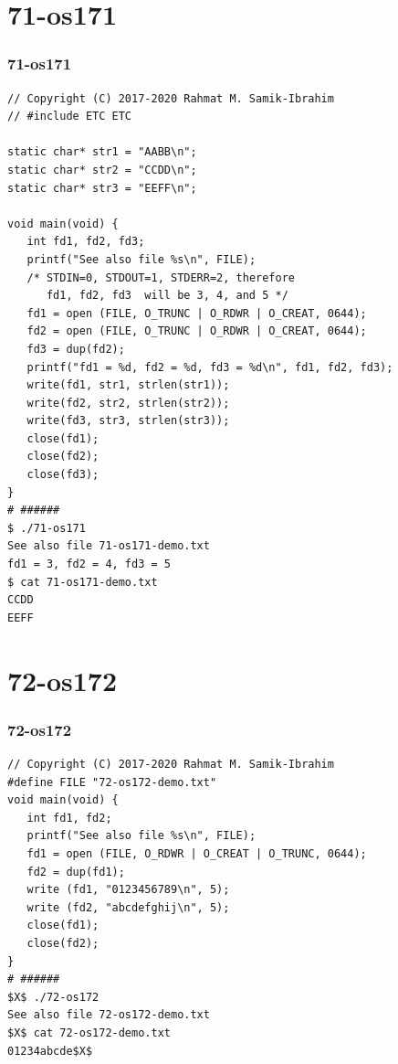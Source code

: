 \documentclass[aspectratio=169, xcolor=table, notheorems, hyperref={pdfpagelabels=false}]{beamer}
\begin{document}
\section{71-os171}
\begin{frame}[fragile]
\frametitle{71-os171}
\begin{lstlisting}[basicstyle=\ttfamily\tiny]
// Copyright (C) 2017-2020 Rahmat M. Samik-Ibrahim
// #include ETC ETC

static char* str1 = "AABB\n";
static char* str2 = "CCDD\n";
static char* str3 = "EEFF\n";

void main(void) {
   int fd1, fd2, fd3;
   printf("See also file %s\n", FILE);
   /* STDIN=0, STDOUT=1, STDERR=2, therefore 
      fd1, fd2, fd3  will be 3, 4, and 5 */
   fd1 = open (FILE, O_TRUNC | O_RDWR | O_CREAT, 0644);
   fd2 = open (FILE, O_TRUNC | O_RDWR | O_CREAT, 0644);
   fd3 = dup(fd2);
   printf("fd1 = %d, fd2 = %d, fd3 = %d\n", fd1, fd2, fd3);
   write(fd1, str1, strlen(str1));
   write(fd2, str2, strlen(str2));
   write(fd3, str3, strlen(str3));
   close(fd1);
   close(fd2);
   close(fd3);
}
# ######
$ ./71-os171 
See also file 71-os171-demo.txt
fd1 = 3, fd2 = 4, fd3 = 5
$ cat 71-os171-demo.txt 
CCDD
EEFF

\end{lstlisting}
\end{frame}

\section{72-os172}
\begin{frame}[fragile]
\frametitle{72-os172}
\begin{lstlisting}[basicstyle=\ttfamily\footnotesize]
// Copyright (C) 2017-2020 Rahmat M. Samik-Ibrahim
#define FILE "72-os172-demo.txt"
void main(void) {
   int fd1, fd2;
   printf("See also file %s\n", FILE);
   fd1 = open (FILE, O_RDWR | O_CREAT | O_TRUNC, 0644);
   fd2 = dup(fd1);
   write (fd1, "0123456789\n", 5);
   write (fd2, "abcdefghij\n", 5);
   close(fd1);
   close(fd2);
}
# ######
$X$ ./72-os172 
See also file 72-os172-demo.txt
$X$ cat 72-os172-demo.txt 
01234abcde$X$

\end{lstlisting}
\end{frame}
\end{document}
